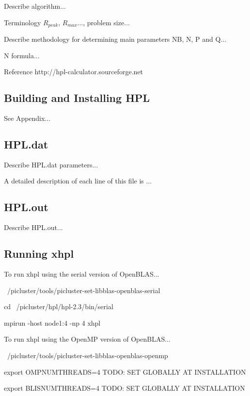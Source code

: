 \documentclass{article}
\begin{document}
Describe algorithm...

Terminology $R_{peak}$, $R_{max}$..., problem size...

Describe methodology for determining main parameters NB, N, P and Q...

N formula...

Reference http://hpl-calculator.sourceforge.net



\subsection{Building and Installing HPL}

See Appendix...



\subsection{HPL.dat}

Describe HPL.dat parameters...



A detailed description of each line of this file is ...

\subsection{HPL.out}

Describe HPL.out...



\subsection{Running xhpl}

To run xhpl using the serial version of OpenBLAS...

~/picluster/tools/picluster-set-libblas-openblas-serial

cd ~/picluster/hpl/hpl-2.3/bin/serial

mpirun -host node1:4 -np 4 xhpl



To run xhpl using the OpenMP version of OpenBLAS...

~/picluster/tools/picluster-set-libblas-openblas-openmp

export OMPNUMTHREADS=4 TODO: SET GLOBALLY AT INSTALLATION

export BLISNUMTHREADS=4 TODO: SET GLOBALLY AT INSTALLATION
\end{document}
